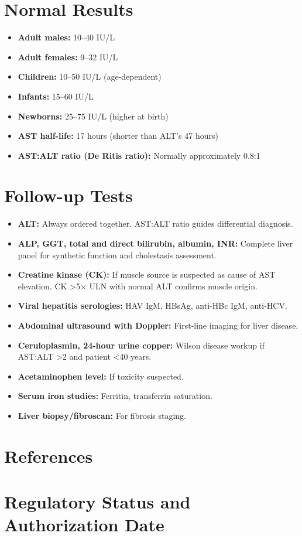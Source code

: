 \section*{Normal Results}
\begin{itemize}
  \item \textbf{Adult males:} 10--40 IU/L
  \item \textbf{Adult females:} 9--32 IU/L
  \item \textbf{Children:} 10--50 IU/L (age-dependent)
  \item \textbf{Infants:} 15--60 IU/L
  \item \textbf{Newborns:} 25--75 IU/L (higher at birth)
  \item \textbf{AST half-life:} 17 hours (shorter than ALT's 47 hours)
  \item \textbf{AST:ALT ratio (De Ritis ratio):} Normally approximately 0.8:1
\end{itemize}

\section*{Follow-up Tests}
\begin{itemize}
  \item \textbf{ALT:} Always ordered together. AST:ALT ratio guides differential diagnosis.
  \item \textbf{ALP, GGT, total and direct bilirubin, albumin, INR:} Complete liver panel for synthetic function and cholestasis assessment.
  \item \textbf{Creatine kinase (CK):} If muscle source is suspected as cause of AST elevation. CK >5$\times$ ULN with normal ALT confirms muscle origin.
  \item \textbf{Viral hepatitis serologies:} HAV IgM, HBsAg, anti-HBc IgM, anti-HCV.
  \item \textbf{Abdominal ultrasound with Doppler:} First-line imaging for liver disease.
  \item \textbf{Ceruloplasmin, 24-hour urine copper:} Wilson disease workup if AST:ALT >2 and patient <40 years.
  \item \textbf{Acetaminophen level:} If toxicity suspected.
  \item \textbf{Serum iron studies:} Ferritin, transferrin saturation.
  \item \textbf{Liver biopsy/fibroscan:} For fibrosis staging.
\end{itemize}

\section*{References}



\clearpage
\section*{Regulatory Status and Authorization Date}

\clearpage
